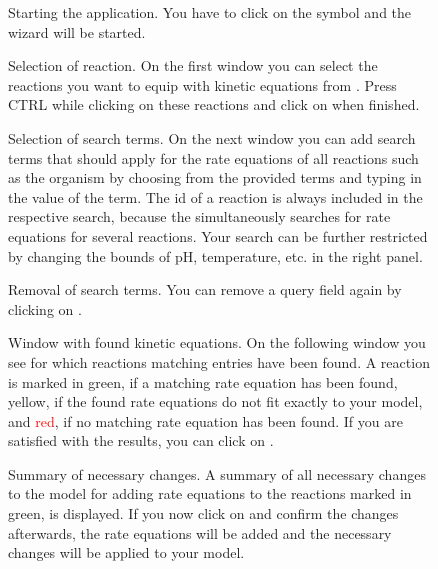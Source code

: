 \begin{figure}[htbp]
\caption{Starting the \SABIO application.
You have to click on the \SABIO symbol and the wizard will be started.}
\label{fig:startAutomatic}
\end{figure}

\begin{figure}[htbp]
\caption{Selection of reaction.
On the first window you can select the reactions you want to equip with kinetic equations from \SABIO. 
Press CTRL%
while clicking on these reactions and click on  when finished.}
\label{fig:selectReations}
\end{figure}

\begin{figure}[htbp]
\caption{Selection of search terms. On the next window you can add search terms
that should apply for the rate equations of all reactions such as the organism
by choosing from the provided terms and typing in the value of the term.
The \KEGG id of a reaction is always included in the respective search,
because the \API simultaneously searches for rate equations for several reactions.
Your search can be further restricted by changing the bounds of pH, temperature,
etc. in the right panel.}
\label{fig:searchTerms}
\end{figure}

\begin{figure}[htbp]
\caption{Removal of search terms.
You can remove a query field again by clicking on .}
\label{fig:removeSearchTerms}
\end{figure}

\begin{figure}[htbp]
\caption{Window with found kinetic equations.
On the following window you see for which reactions matching entries have been found.
A reaction is marked in green, if a matching rate equation has been found, yellow,
if the found rate equations do not fit exactly to your model, and \textcolor{red}{red}, if no matching
rate equation has been found. If you are satisfied with the results, you can click on .}
\label{fig:foundEquations}
\end{figure}


\begin{figure}[htbp]
\caption{Summary of necessary changes.
A summary of all necessary changes to the model for adding rate equations to the
reactions marked in green, is displayed.
If you now click on  and confirm the changes afterwards, the rate
equations will be added and the necessary changes will be applied to your model.}
\label{fig:changes}
\end{figure}





